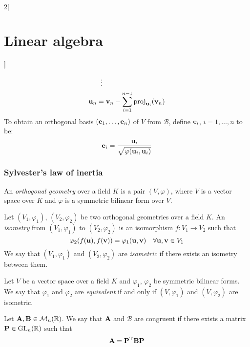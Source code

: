 \documentclass[../../../main.tex]{subfiles}
\begin{document}
\begin{multicols}{2}[\section{Linear algebra}]
\begin{method}
\begin{align*}
                           & \;\;\vdots                                                                                                                              \\
      \boldsymbol{\mathrm{u}}_n & =\boldsymbol{\mathrm{v}}_n-\sum_{i=1}^{n-1}\text{proj}_{\boldsymbol{\mathrm{u}}_i}(\boldsymbol{\mathrm{v}}_n)
    \end{align*}
    To obtain an orthogonal basis $(\boldsymbol{\mathrm{e}}_1,\ldots,\boldsymbol{\mathrm{e}}_n)$ of $V$ from $\mathcal{B}$, define $\boldsymbol{\mathrm{e}}_i$, $i=1,\ldots,n$ to be: $$\boldsymbol{\mathrm{e}}_i=\frac{\boldsymbol{\mathrm{u}}_i}{\sqrt{\varphi(\boldsymbol{\mathrm{u}}_i,\boldsymbol{\mathrm{u}}_i)}}$$
  \end{method}
  \subsubsection{Sylvester's law of inertia}
  \begin{definition}
    An \emph{orthogonal geometry} over a field $K$ is a pair $(V,\varphi)$, where $V$ is a vector space over $K$ and $\varphi$ is a symmetric bilinear form over $V$.
  \end{definition}
  \begin{definition}\label{LA_isometry}
    Let $(V_1,\varphi_1)$, $(V_2,\varphi_2)$ be two orthogonal geometries over a field $K$. An \emph{isometry} from $(V_1,\varphi_1)$ to $(V_2,\varphi_2)$ is an isomorphism $f:V_1\rightarrow V_2$ such that $$\varphi_2(f(\boldsymbol{\mathrm{u}}),f(\boldsymbol{\mathrm{v}}))=\varphi_1(\boldsymbol{\mathrm{u}},\boldsymbol{\mathrm{v}})\quad\forall\boldsymbol{\mathrm{u}},\boldsymbol{\mathrm{v}}\in V_1$$ We say that $(V_1,\varphi_1)$ and $(V_2,\varphi_2)$ are \emph{isometric} if there exists an isometry between them.
  \end{definition}
  \begin{definition}
    Let $V$ be a vector space over a field $K$ and $\varphi_1$, $\varphi_2$ be symmetric bilinear forms. We say that $\varphi_1$ and $\varphi_2$ are \emph{equivalent} if and only if $(V,\varphi_1)$ and $(V,\varphi_2)$ are isometric.
  \end{definition}
  \begin{definition}
    Let $\boldsymbol{\mathrm{A}},\boldsymbol{\mathrm{B}}\in\mathcal{M}_n(\mathbb{R})$. We say that $\boldsymbol{\mathrm{A}}$ and $\mathcal{B}$ are congruent if there exists a matrix $\boldsymbol{\mathrm{P}}\in\mathrm{GL}_n(\mathbb{R})$ such that $$\boldsymbol{\mathrm{A}}=\vb{P}^{\mathrm{T}}\boldsymbol{\mathrm{B}}\boldsymbol{\mathrm{P}}$$
  \end{definition}
  \begin{prop}

\end{prop}
\end{multicols}
\end{document}
